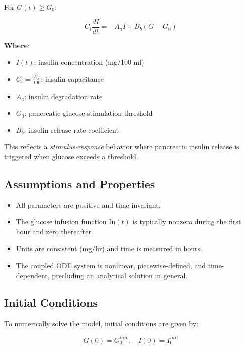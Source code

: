 \documentclass[conference]{IEEEtran}
\begin{document}
For $G(t) \geq G_0$:

\begin{equation}
    C_i \frac{dI}{dt} = -A_a I + B_b (G - G_0)
    \label{eq:insulin_above_threshold}
\end{equation}

\noindent \textbf{Where}:

\begin{itemize}
    \item $I(t)$: insulin concentration (mg/100 ml)
    \item $C_i = \frac{E_x}{100}$: insulin capacitance
    \item $A_a$: insulin degradation rate
    \item $G_0$: pancreatic glucose stimulation threshold
    \item $B_b$: insulin release rate coefficient
\end{itemize}

This reflects a \textit{stimulus-response} behavior where pancreatic insulin release is triggered when glucose exceeds a threshold.

\subsection{Assumptions and Properties}

\begin{itemize}
    \item All parameters are positive and time-invariant.
    \item The glucose infusion function $\mathrm{In}(t)$ is typically nonzero during the first hour and zero thereafter.
    \item Units are consistent (mg/hr) and time is measured in hours.
    \item The coupled ODE system is nonlinear, piecewise-defined, and time-dependent, precluding an analytical solution in general.
\end{itemize}

\subsection{Initial Conditions}

To numerically solve the model, initial conditions are given by:

\begin{equation}
    G(0) = G_0^{init}, \quad I(0) = I_0^{init}
\end{equation}
\end{document}
